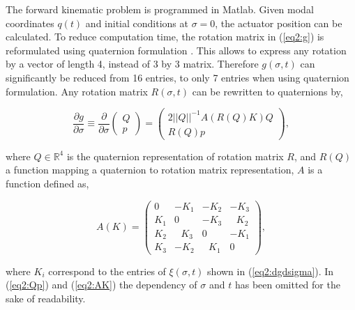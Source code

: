 The forward kinematic problem is programmed in Matlab. Given modal coordinates $q(t)$ and initial conditions at $\sigma = 0$, the actuator position can be calculated. To reduce computation time, the rotation matrix in (\ref{eq2:g}) is reformulated using quaternion formulation \cite{Boyer2019}. This allows to express any rotation by a vector of length 4, instead of 3 by 3 matrix. Therefore $g(\sigma,t)$ can significantly be reduced from 16 entries, to only 7 entries when using quaternion formulation. Any rotation matrix $R(\sigma,t)$ can be rewritten to quaternions by,


\begin{equation}
\frac{\partial g}{\partial \sigma} \equiv \frac{\partial}{\partial \sigma}    \begin{pmatrix} Q \\ p \end{pmatrix} = \begin{pmatrix} 2 ||Q||^{-1} A(R(Q)K)Q \\ R(Q)p \end{pmatrix},
\label{eq2:Qp}
\end{equation}

where $Q \in \mathbb{R}^4$ is the quaternion representation of rotation matrix $R$, and $R(Q)$ a function mapping a quaternion to rotation matrix representation, $A$ is a function defined as,


\begin{equation}
    A(K) = \begin{pmatrix} 0 & -K_1 & -K_2 & -K_3 \\ K_1 & 0 & -K_3 & \hspace{8pt}K_2 \\ K_2 & \hspace{8pt}K_3 & 0 & -K_1 \\ K_3 & -K_2 & \hspace{8pt}K_1 & 0 \end{pmatrix},
    \label{eq2:AK}
\end{equation}

where $K_i$ correspond to the entries of $\xi(\sigma,t)$ shown in (\ref{eq2:dgdsigma}). In  (\ref{eq2:Qp}) and (\ref{eq2:AK}) the dependency of $\sigma$ and $t$ has been omitted for the sake of readability.



